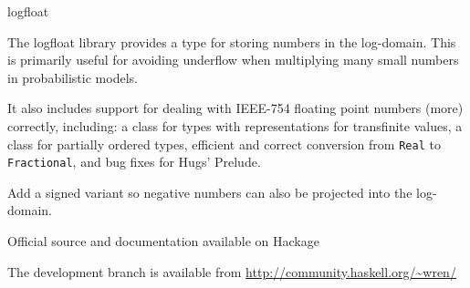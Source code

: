 \begin{hcarentry}[new]{logfloat}
\makeheader

The logfloat library provides a type for storing numbers in the log-domain. This is primarily useful for avoiding underflow when multiplying many small numbers in probabilistic models.

It also includes support for dealing with IEEE-754 floating point numbers (more) correctly, including: a class for types with representations for transfinite values, a class for partially ordered types, efficient and correct conversion from \texttt{Real} to \texttt{Fractional}, and bug fixes for Hugs' Prelude.

\FuturePlans
Add a signed variant so negative numbers can also be projected into the log-domain.

\FurtherReading
\begin{compactitem}
\item Official source and documentation available on Hackage
\item The development branch is available from \url{http://community.haskell.org/~wren/}
\end{compactitem}
\end{hcarentry}
